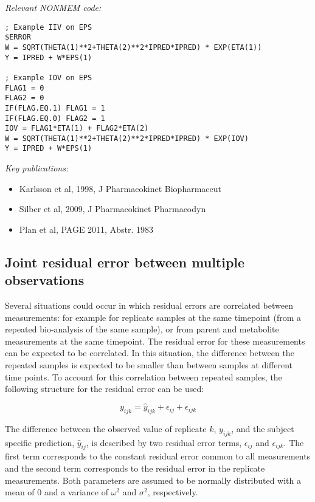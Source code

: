 \documentclass[a4paper,11pt]{article}
\begin{document}
\vspace{10pt}

\noindent \emph{Relevant NONMEM code:}
\begin{lstlisting}
; Example IIV on EPS
$ERROR
W = SQRT(THETA(1)**2+THETA(2)**2*IPRED*IPRED) * EXP(ETA(1))
Y = IPRED + W*EPS(1)

; Example IOV on EPS
FLAG1 = 0
FLAG2 = 0
IF(FLAG.EQ.1) FLAG1 = 1
IF(FLAG.EQ.0) FLAG2 = 1
IOV = FLAG1*ETA(1) + FLAG2*ETA(2)
W = SQRT(THETA(1)**2+THETA(2)**2*IPRED*IPRED) * EXP(IOV)
Y = IPRED + W*EPS(1)
\end{lstlisting}

\noindent \emph{Key publications:} 
\begin{itemize}
\item Karlsson et al, 1998, J Pharmacokinet Biopharmaceut
\item Silber et al, 2009, J Pharmacokinet Pharmacodyn 
\item Plan et al, PAGE 2011, Abstr. 1983
\end{itemize}

\subsection{Joint residual error between multiple observations}
Several situations could occur in which residual errors are correlated between measurements: for example for replicate samples at the same timepoint (from a repeated bio-analysis of the same sample), or from parent and metabolite measurements at the same timepoint. The residual error for these measurements can be expected to be correlated. In this situation, the difference between the repeated samples is expected to be smaller than between samples at different time points. To account for this correlation between repeated samples, the following structure for the residual error can be used: 

\begin{equation}
y_{ijk} = \hat{y}_{ijk} + \epsilon_{ij} + \epsilon_{ijk}
\end{equation}

The difference between the observed value of replicate $k$, $y_{ijk}$,
and the subject specific prediction, $\hat{y}_{ij}$, is described by
two residual error terms, $\epsilon_{ij}$ and $\epsilon_{ijk}$. The
first term corresponds to the constant residual error common to all
measurements and the second term corresponds to the residual error in
the replicate measurements. Both parameters are assumed to be normally
distributed with a mean of 0 and a variance of $\omega^2$ and $\sigma^2$,
respectively.
\end{document}

